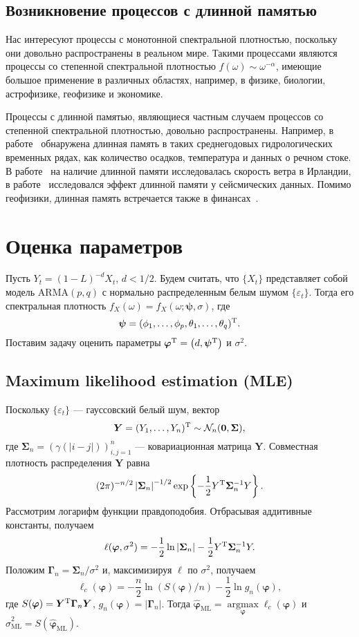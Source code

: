\documentclass[specialist,
substylefile = spbu_report.rtx,
subf,href,colorlinks=true, 12pt]{disser}
\theoremstyle{definition}
\begin{document}
\subsection{Возникновение процессов с длинной памятью}
Нас интересуют процессы с монотонной спектральной плотностью, поскольку они довольно распространены в реальном мире. Такими процессами являются процессы со степенной спектральной плотностью $f(\omega)\sim \omega^{-\alpha}$, имеющие большое применение в различных областях, например, в физике, биологии, астрофизике, геофизике и экономике.

Процессы с длинной памятью, являющиеся частным случаем процессов со степенной спектральной плотностью, довольно распространены. Например, в работе~\cite{Hipel1994} обнаружена длинная память в таких среднегодовых гидрологических временных рядах, как количество осадков, температура и данных о речном стоке. В работе~\cite{Haslett1989} на наличие длинной памяти исследовалась скорость ветра в Ирландии, в работе~\cite{Mariani2020} исследовался эффект длинной памяти у сейсмических данных. Помимо геофизики, длинная память встречается также в финансах~\cite{Barkoulas1997,Guglielmo2019}.

\section{Оценка параметров}
Пусть $Y_t=(1-L)^{-d}X_t$, $d<1/2$. Будем считать, что $\{X_t\}$ представляет собой модель $\mathrm{ARMA}(p, q)$ с нормально распределенным белым шумом $\{\varepsilon_t\}$. Тогда его спектральная плотность $f_X(\omega)=f_X(\omega; \bm\psi, \sigma)$, где
\[
\bm\psi=(\phi_1,\ldots,\phi_p,\theta_1,\ldots,\theta_q)^{\mathrm{T}}.
\]
Поставим задачу оценить параметры $\bm\varphi^{\mathrm{T}}=\left(d, \bm\psi^{\mathrm{T}}\right)$ и $\sigma^2$.

\subsection{Maximum likelihood estimation (MLE)}
Поскольку $\{\varepsilon_t\}$ --- гауссовский белый шум, вектор
\[
	\bm Y=(Y_1,\ldots,Y_n)^{\mathrm{T}}\sim \mathcal{N}_n(\bm0, \bm\Sigma),
\]
где $\bm\Sigma_n=(\gamma(|i-j|))_{i,j=1}^n$ --- ковариационная матрица $\bm Y$. Совместная плотность распределения $\bm Y$ равна
\[
	(2\pi)^{-n/2}\left|\bm\Sigma_n\right|^{-1/2}\exp\left\{-\frac12Y^{\mathrm{T}}\bm\Sigma_n^{-1}Y\right\}.
\]
Рассмотрим логарифм функции правдоподобия. Отбрасывая аддитивные константы, получаем
\[
	\ell(\bm\varphi, \sigma^2)=-\frac12\ln\left|\bm\Sigma_n\right|-\frac12 Y^{\mathrm{T}} \bm\Sigma_n^{-1} Y.
\]
Положим $\bm\Gamma_n=\bm\Sigma_n / \sigma^2$ и, максимизируя $\ell$ по $\sigma^2$, получаем
\[
\ell_c(\bm\varphi)=-\frac{n}{2}\ln\left(S(\bm\varphi) / n\right) - \frac{1}{2}\ln g_n(\bm\varphi),
\] 
где $S(\bm\varphi)=\bm Y^{\mathrm{T}} \bm\Gamma_n\bm Y$, $g_n(\bm\varphi)=\left|\bm\Gamma_n\right|$.
Тогда $\widehat{\bm\varphi}_\mathrm{ML}=\operatorname*{argmax}\limits_{\bm\varphi}\ell_c(\bm\varphi)$ и $\widehat\sigma^2_\mathrm{ML} = S(\widehat{\bm\varphi}_\mathrm{ML})$.
\end{document}
